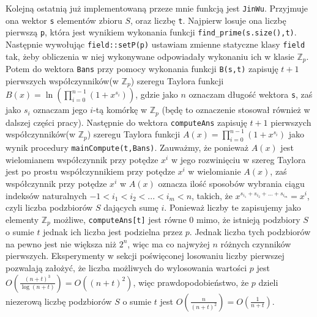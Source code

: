\documentclass{article}
\begin{document}
Kolejną ostatnią już implementowaną przeze mnie funkcją jest \texttt{JinWu}. Przyjmuje ona wektor \texttt{s} 
elementów zbioru 
$S$, oraz
liczbę \texttt{t}. Najpierw losuje ona liczbę pierwszą \texttt{p}, która jest wynikiem wykonania funkcji 
\texttt{find\_prime(s.size(),t)}. Następnie
wywołując \texttt{field::setP(p)} ustawiam zmienne statyczne klasy \texttt{field} tak, żeby obliczenia w niej wykonywane 
odpowiadały wykonaniu ich w klasie $\mathbb{Z}_p$. Potem do wektora \texttt{Bans} przy pomocy wykonania funkcji 
\texttt{B(s,t)} zapisuję
$t+1$ pierwszych współczynników(w $\mathbb{Z}_p$) szeregu Taylora funkcji $B(x)=\ln(\prod_{i=0}^{n-1}(1+x^{s_i}))$, gdzie jako $n$ oznaczam długość
wektora \texttt{s}, zaś jako $s_i$ oznaczam jego $i$-tą komórkę w $\mathbb{Z}_p$ (będę to oznaczenie stosował również w dalszej części pracy). 
Następnie do wektora \texttt{computeAns} zapisuję $t+1$ pierwszych współczynników(w $\mathbb{Z}_p$) szeregu Taylora funkcji 
$A(x)=\prod_{i=0}^{n-1}(1+x^{s_i})$ jako wynik procedury \texttt{mainCompute(t,Bans)}. 
Zauważmy, że ponieważ $A(x)$ jest wielomianem współczynnik
przy potędze $x^i$ w jego rozwinięciu w szereg Taylora jest po prostu współczynnikiem przy potędze $x^i$ w wielomianie $A(x)$, zaś współczynnik przy potędze $x^i$ w $A(x)$ oznacza ilość sposobów wybrania ciągu indeksów naturalnych $-1<i_1<i_2<...<i_m<n$, 
takich, że
$x^{s_{i_1}+s_{i_2}+...+s_{i_m}}=x^i$, czyli liczba podzbiorów $S$ dających sumę $i$. Ponieważ liczby te zapisujemy jako elementy 
$\mathbb{Z}_p$ możliwe, \texttt{computeAns[t]} jest równe $0$ mimo, że istnieją podzbiory $S$ o sumie $t$ jednak ich liczba jest podzielna
przez $p$. Jednak liczba tych podzbiorów na pewno jest nie większa niż $2^n$, więc ma co najwyżej $n$ różnych czynników pierwszych.
Eksperymenty w sekcji poświęconej losowaniu liczby pierwszej pozwalają założyć, że liczba możliwych do wylosowania wartości $p$
jest $O(\frac{(n+t)^3}{\log(n+t)})=O((n+t)^2)$, więc prawdopodobieństwo, że $p$ dzieli niezerową liczbę podzbiorów $S$ o sumie $t$
jest $O(\frac{n}{(n+t)^2})=O(\frac{1}{n+t})$.
\end{document}
